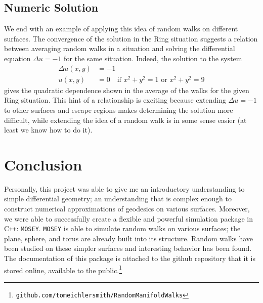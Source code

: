 \documentclass[12pt]{article}
\newcommand{\MOSEY}{\texttt{MOSEY}}
\begin{document}
	\subsection{Numeric Solution} \label{NumericSoln}
		We end with an example of applying this idea of random walks on different surfaces.
		The convergence of the solution in the Ring situation suggests a relation between averaging random walks in a situation and solving the differential equation $\Delta u = -1$ for the same situation.
		Indeed, the solution to the system
		\begin{equation*} \begin{split} 
			\Delta u(x,y) & = -1 \\
			u(x,y) & = 0 \quad\text{if } x^2+y^2 = 1 \text{ or } x^2+y^2 = 9
		\end{split} \end{equation*}
		gives the quadratic dependence shown in the average of the walks for the given Ring situation.
		This hint of a relationship is exciting because extending $\Delta u = -1$ to other surfaces and escape regions makes determining the solution more difficult, while extending the idea of a random walk is in some sense easier (at least we know how to do it).

\section{Conclusion}
	Personally, this project was able to give me an introductory understanding to simple differential geometry; an understanding that is complex enough to construct numerical approximations of geodesics on various surfaces.
	Moreover, we were able to successfully create a flexible and powerful simulation package in C\texttt{++}: \MOSEY{}.
	\MOSEY{} is able to simulate random walks on various surfaces; the plane, sphere, and torus are already built into its structure.
	Random walks have been studied on these simpler surfaces and interesting behavior has been found.
	The documentation of this package is attached to the github repository that it is stored online, available to the public.\footnote{
		\texttt{github.com/tomeichlersmith/RandomManifoldWalks}
		}
	

\pagebreak


\end{document}
